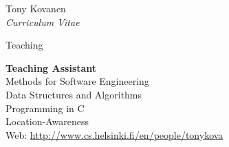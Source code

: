 \documentclass[10pt]{article}
\begin{document}
\begin{cv}{Tony Kovanen\\{\large \itshape Curriculum Vitae}}
\begin{cvlist}{Teaching}
	\item {\bf Teaching Assistant}\\
	Methods for Software Engineering\\
    Data Structures and Algorithms\\
    Programming in C\\
    Location-Awareness\\
	
	Web: \url{http://www.cs.helsinki.fi/en/people/tonykova}
\end{cvlist}	



%


\end{cv}
\end{document}
